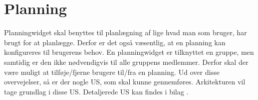\section{Planning}\label{sec:Planning_arkitektur}

Planningwidget skal benyttes til planlægning af lige hvad man som bruger, har brugt for at planlægge. Derfor er det også væsentlig, at en planning kan konfigureres til brugerens behov. En planningwidget er tilknyttet en gruppe, men samtidig er den ikke nødvendigvis til alle gruppens medlemmer. Derfor skal der være muligt at tilføje/fjerne brugere til/fra en planning. Ud over disse overvejelser, så er der nogle US, som skal kunne gennemføres. Arkitekturen vil tage grundlag i disse US. Detaljerede US kan findes i bilag \cite{KravspecUserStoriesPlanning}.




